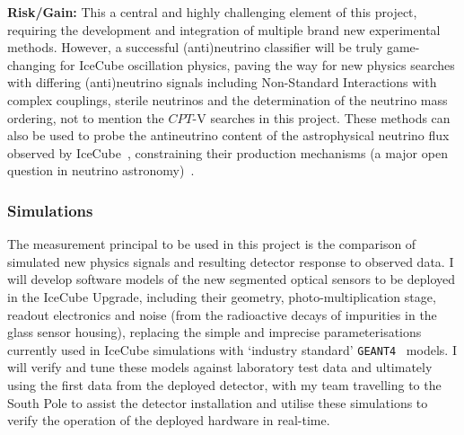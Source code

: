 \documentclass[a4paper,11pt]{article}
\begin{document}
\textbf{Risk/Gain:} This a central and highly challenging element of this project, requiring the development and integration of multiple brand new experimental methods. However, a successful (anti)neutrino classifier will be truly game-changing for IceCube oscillation physics, paving the way for new physics searches with differing (anti)neutrino signals including Non-Standard Interactions with complex couplings, sterile neutrinos and the determination of the neutrino mass ordering, not to mention the $CPT$-V searches in this project. These methods can also be used to probe the antineutrino content of the astrophysical neutrino flux observed by IceCube~\cite{Aartsen:2013jdh}, constraining their production mechanisms (a major open question in neutrino astronomy)~\cite{glashow_icecube}. \\


\subsubsection{Simulations}


The measurement principal to be used in this project is the comparison of simulated new physics signals and resulting detector response to observed data. I will develop software models of the new segmented optical sensors to be deployed in the IceCube Upgrade, including their geometry, photo-multiplication stage, readout electronics and noise (from the radioactive decays of impurities in the glass sensor housing), replacing the simple and imprecise parameterisations currently used in IceCube simulations with `industry standard' \texttt{GEANT4}~\cite{Agostinelli:2002hh} models. I will verify and tune these models against laboratory test data and ultimately using the first data from the deployed detector, with my team travelling to the South Pole to assist the detector installation and utilise these simulations to verify the operation of the deployed hardware in real-time.
\end{document}
